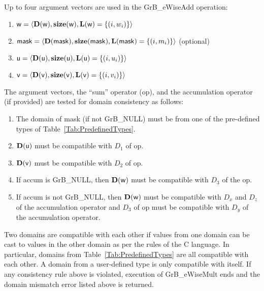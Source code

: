Up to four argument vectors are used in the {\sf GrB\_eWiseAdd} operation:
\begin{enumerate}
	\item ${\sf w} = \langle \bold{D}({\sf w}),\bold{size}({\sf w}),\bold{L}({\sf w}) = \{(i,w_i) \} \rangle$
	\item ${\sf mask} = \langle \bold{D}({\sf mask}),\bold{size}({\sf mask}),\bold{L}({\sf mask}) = \{(i,m_i) \} \rangle$ (optional)
	\item ${\sf u} = \langle \bold{D}({\sf u}),\bold{size}({\sf u}),\bold{L}({\sf u}) = \{(i,u_i) \} \rangle$
	\item ${\sf v} = \langle \bold{D}({\sf v}),\bold{size}({\sf v}),\bold{L}({\sf v}) = \{(i,v_i) \} \rangle$
\end{enumerate}

The argument vectors, the ``sum'' operator ({\sf op}), and the accumulation 
operator (if provided) are tested for domain consistency as follows:
\begin{enumerate}
	\item The domain of {\sf mask} (if not {\sf GrB\_NULL}) must be from one of the pre-defined types of Table~\ref{Tab:PredefinedTypes}.

	\item $\bold{D}({\sf u})$ must be compatible with $D_1$ of {\sf op}.

	\item $\bold{D}({\sf v})$ must be compatible with $D_2$ of {\sf op}.

	\item If {\sf accum} is {\sf GrB\_NULL}, then $\bold{D}({\sf w})$ must be 
    compatible with $D_3$ of the {\sf op}.

	\item If {\sf accum} is not {\sf GrB\_NULL}, then $\bold{D}({\sf w})$ must be
    compatible with $D_x$ and $D_z$ of the accumulation operator and $D_3$ of
    {\sf op} must be compatible with $D_y$ of the accumulation operator.
\end{enumerate}
Two domains are compatible with each other if values from one domain can be cast 
to values in the other domain as per the rules of the C language.
In particular, domains from Table~\ref{Tab:PredefinedTypes} are all compatible 
with each other. A domain from a user-defined type is only compatible with itself.
If any consistency rule above is violated, execution of {\sf GrB\_eWiseMult} ends
and the domain mismatch error listed above is returned.

